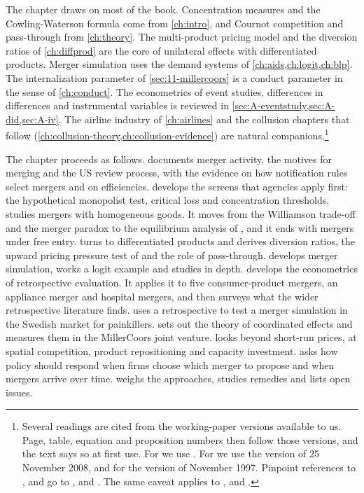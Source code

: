 The chapter draws on most of the book. Concentration measures and the Cowling-Waterson formula come from
\cref{ch:intro}, and Cournot competition and pass-through from \cref{ch:theory}. The multi-product pricing model and
the diversion ratios of \cref{ch:diffprod} are the core of unilateral effects with differentiated products. Merger
simulation uses the demand systems of \cref{ch:aids,ch:logit,ch:blp}. The internalization parameter of
\cref{sec:11-millercoors} is a conduct parameter in the sense of \cref{ch:conduct}. The econometrics of event studies,
differences in differences and instrumental variables is reviewed in \cref{sec:A-eventstudy,sec:A-did,sec:A-iv}. The airline industry of
\cref{ch:airlines} and the collusion chapters that follow (\cref{ch:collusion-theory,ch:collusion-evidence}) are
natural companions.\footnote{Several readings are cited from the working-paper versions available to us. Page,
table, equation and proposition numbers then follow those versions, and the text says so at first use. For
\citet{FarrellShapiro1990} we use \citet{FarrellShapiro1988}. For \citet{FarrellShapiro2010} we use the version of
25 November 2008, and for \citet{Nevo2000b} the version of November 1997. Pinpoint references to
\citet{AshenfelterHosken2010}, \citet{AshenfelterHoskenWeinberg2013} and \citet{Dafny2009} go to
\citet{AshenfelterHosken2008}, \citet{AshenfelterHoskenWeinberg2011} and \citet{Dafny2005}. The same caveat applies
to \citet{Pesendorfer2003}, \citet{Sweeting2010} and \citet{NockeWhinston2013}.}

The chapter proceeds as follows.  documents merger activity, the motives for merging and the
US review process, with the evidence on how notification rules select mergers and on efficiencies.
 develops the screens that agencies apply first: the hypothetical monopolist test, critical
loss and concentration thresholds.  studies mergers with homogeneous goods. It moves from the
Williamson trade-off and the merger paradox to the equilibrium analysis of \citet{FarrellShapiro1990}, and it ends
with mergers under free entry.  turns to differentiated products and derives diversion ratios, the
upward pricing pressure test of \citet{FarrellShapiro2010} and the role of pass-through. 
develops merger simulation, works a logit example and studies \citet{Nevo2000b} in depth. 
develops the econometrics of retrospective evaluation. It applies it to five consumer-product mergers, an appliance
merger and hospital mergers, and then surveys what the wider retrospective literature finds.  uses a
retrospective to test a merger simulation in the Swedish market for painkillers.  sets out
the theory of coordinated effects and measures them in the MillerCoors joint venture.  looks
beyond short-run prices, at spatial competition, product repositioning and capacity investment. 
asks how policy should respond when firms choose which merger to propose and when mergers arrive over time.
 weighs the approaches, studies remedies and lists open issues.


